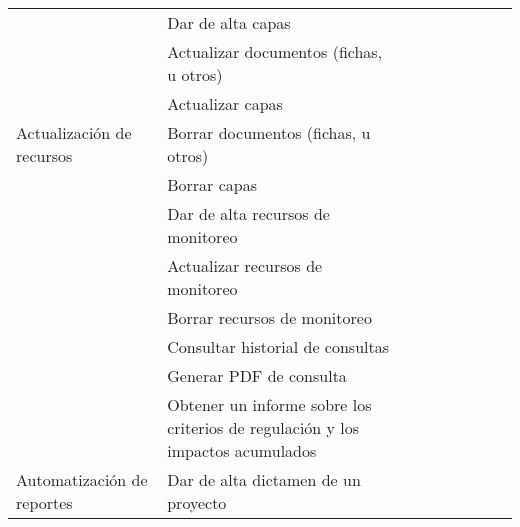 \documentclass[a4paper]{report}
\begin{document}
\begin{longtable}{p{4cm} p{7cm} p{.5cm} p{.5cm} p{.5cm} p{0.8cm} p{0.8cm} p{0.8cm}p{0.8cm}}
 & Dar de alta capas & \cellcolor{myotroazul} & &\cellcolor{myotroazul} &\cellcolor{myamarillo}&\cellcolor{myamarillo}&\cellcolor{myamarillo}&\cellcolor{myamarillo}\\

 & Actualizar documentos (fichas, u otros) &\cellcolor{myotroazul}  & &\cellcolor{myotroazul} &\cellcolor{myamarillo}&\cellcolor{myamarillo}&\cellcolor{myamarillo}&\cellcolor{myamarillo}\\

& Actualizar capas &\cellcolor{myotroazul} & & \cellcolor{myotroazul} &\cellcolor{myamarillo}&\cellcolor{myamarillo}&\cellcolor{myamarillo}&\cellcolor{myamarillo}\\

Actualización de recursos & Borrar documentos (fichas, u otros) &\cellcolor{myotroazul} & &\cellcolor{myotroazul} &\cellcolor{myamarillo}&\cellcolor{myamarillo}&\cellcolor{myamarillo}&\cellcolor{myamarillo}\\

 & Borrar capas &\cellcolor{myotroazul} & & \cellcolor{myotroazul} &\cellcolor{myamarillo}&\cellcolor{myamarillo}&\cellcolor{myamarillo}&\cellcolor{myamarillo}\\

 & Dar de alta recursos de monitoreo &\cellcolor{myotroazul} & &\cellcolor{myotroazul} &&&&\cellcolor{myamarillo}\\

 & Actualizar recursos de monitoreo &\cellcolor{myotroazul} & & \cellcolor{myotroazul} &&&&\cellcolor{myamarillo}\\

 & Borrar recursos de monitoreo &\cellcolor{myotroazul} & & \cellcolor{myotroazul} &&&&\cellcolor{myamarillo}\\
 & Consultar historial de consultas &\cellcolor{myotroazul} & & \cellcolor{myotroazul} &&&&\cellcolor{myamarillo}\\
 & Generar PDF de consulta &\cellcolor{myotroazul} & & \cellcolor{myotroazul} &&&&\cellcolor{myamarillo}\\
\hline
 &
Obtener un informe sobre los criterios de regulación y los impactos acumulados & \cellcolor{myotroazul}& & \cellcolor{myotroazul} &&&&\cellcolor{myamarillo}\\

Automatización de reportes & Dar de alta dictamen de un proyecto &\cellcolor{myotroazul} & & \cellcolor{myotroazul} &&&&\\


\end{longtable}
\end{document}
